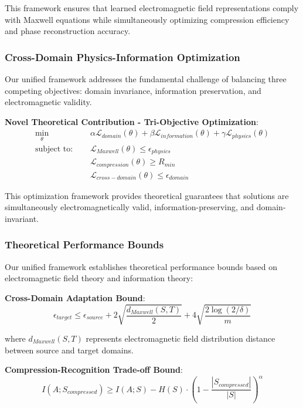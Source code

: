 \documentclass[journal]{IEEEtran}
\begin{document}
This framework ensures that learned electromagnetic field representations comply with Maxwell equations while simultaneously optimizing compression efficiency and phase reconstruction accuracy.

\subsubsection{Cross-Domain Physics-Information Optimization}

Our unified framework addresses the fundamental challenge of balancing three competing objectives: domain invariance, information preservation, and electromagnetic validity.

\textbf{Novel Theoretical Contribution - Tri-Objective Optimization}:
\begin{align}
\min_{\theta} &\quad \alpha \mathcal{L}_{domain}(\theta) + \beta \mathcal{L}_{information}(\theta) + \gamma \mathcal{L}_{physics}(\theta) \\
\text{subject to: } &\quad \mathcal{L}_{Maxwell}(\theta) \leq \epsilon_{physics} \\
&\quad \mathcal{L}_{compression}(\theta) \geq R_{min} \\
&\quad \mathcal{L}_{cross-domain}(\theta) \leq \epsilon_{domain}
\end{align}

This optimization framework provides theoretical guarantees that solutions are simultaneously electromagnetically valid, information-preserving, and domain-invariant.

\subsubsection{Theoretical Performance Bounds}

Our unified framework establishes theoretical performance bounds based on electromagnetic field theory and information theory:

\textbf{Cross-Domain Adaptation Bound}:
\begin{equation}
\epsilon_{target} \leq \epsilon_{source} + 2\sqrt{\frac{d_{Maxwell}(S,T)}{2}} + 4\sqrt{\frac{2\log(2/\delta)}{m}}
\end{equation}

where $d_{Maxwell}(S,T)$ represents electromagnetic field distribution distance between source and target domains.

\textbf{Compression-Recognition Trade-off Bound}:
\begin{equation}
I(A; S_{compressed}) \geq I(A; S) - H(S) \cdot (1 - \frac{|S_{compressed}|}{|S|})^{\alpha}
\end{equation}
\end{document}
